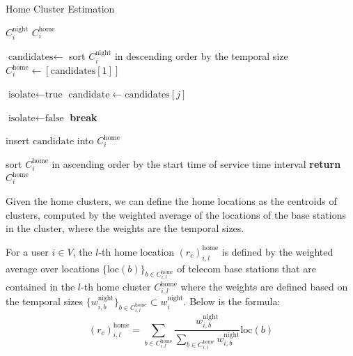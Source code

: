 \begin{algorithm}[h!]
    \renewcommand{\algorithmicrequire}{\textbf{Input:}}
    \renewcommand{\algorithmicensure}{\textbf{Output:}}
    \caption{Home Cluster Estimation}
    \label{home_cluster}
    \begin{algorithmic}[1]
        \REQUIRE $C^\text{night}_i$
        \ENSURE $C^\text{home}_i$

        \STATE $\text{candidates} \leftarrow$ sort $C^\text{night}_i$ in descending order by the temporal size
        \STATE $C^\text{home}_i \leftarrow [\text{candidates}[1]]$
        \STATE

            \STATE $\text{isolate} \gets \text{true}$
            \STATE $\text{candidate} \gets \text{candidates}[j]$
            \STATE

                    \STATE $\text{isolate} \gets \text{false}$
                    \STATE \textbf{break}
                \ENDIF
            \ENDFOR
            \STATE

                \STATE insert $\text{candidate}$ into $C^\text{home}_i$
            \ENDIF
        \ENDFOR
        \STATE

        \STATE sort $C^\text{home}_i$ in ascending order by the start time of service time interval
        \STATE \textbf{return} $C^\text{home}_i$
    \end{algorithmic}
\end{algorithm}

Given the home clusters, we can define the home locations as the centroids of clusters, computed by the weighted average of the locations of the base stations in the cluster, where the weights are the temporal sizes.

\begin{definition}
For a user $i \in V$, the $l$-th home location $(r_c)^{\text{home}}_{i, l}$ is defined by the weighted average over locations $\{\text{loc}(b)\}_{b \in C^{\text{home}}_{i, l}}$ of telecom base stations that are contained in the $l$-th home cluster $C^{\text{home}}_{i, l}$ where the weights are defined based on the temporal sizes $\{w^{\text{night}}_{i, b}\}_{b \in C^{\text{home}}_{i, l}} \subset w^\text{night}_i$. Below is the formula:
$$
(r_c)^{\text{home}}_{i, l}
=
\sum_{b \in C^{\text{home}}_{i, l}}
    \frac{
        w^{\text{night}}_{i, b}
    }{
        \sum_{b \in C^{\text{home}}_{i, l}}
            w^{\text{night}}_{i, b}
    }
    \text{loc}(b)
$$
\end{definition}

